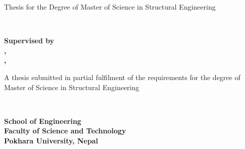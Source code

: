 \begin{titlepage}
    \begin{center}
        
        {\fontsize{16}{20}\selectfont Thesis for the Degree of Master of Science in Structural Engineering} \\[14pt] %

        \vspace{10pt} %

        {\fontsize{20}{24}\selectfont \textbf{\myThesisTitle}} \\[42pt] %

        \vspace{10pt} %

        {\fontsize{16}{20}\selectfont \textbf{Supervised by}} \\[8pt]
        {\fontsize{14}{18}\selectfont \textbf{\mySupervisorOneName, \mySupervisorOneDesignation}} \\
        {\fontsize{14}{18}\selectfont \textbf{\mySupervisorTwoName, \mySupervisorTwoDesignation}} \\[42pt] %

        \vspace{10pt} %

        {\fontsize{16}{20}\selectfont A thesis submitted in partial fulfilment of the requirements for the degree of Master of Science in Structural Engineering} \\[14pt] %

        \vspace{10pt} %

        \vspace{76.51pt}
        {\fontsize{16}{20}\selectfont \textbf{\myStudentName}} \\
        {\fontsize{16}{20}\selectfont \textbf{\myRegistrationNumber}} \par

        \vspace{28pt}
        {\fontsize{16}{20}\selectfont \textbf{School of Engineering}} \\
        {\fontsize{16}{20}\selectfont \textbf{Faculty of Science and Technology}} \\
        {\fontsize{16}{20}\selectfont \textbf{Pokhara University, Nepal}} \par
        \vspace{28pt}
        \vfill %

        {\fontsize{16}{20}\selectfont \textbf{\mySubmissionDate}} %

    \end{center}
\end{titlepage}
